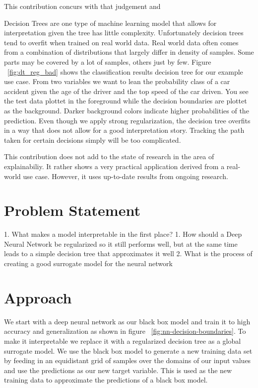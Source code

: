 \documentclass{article} %
\begin{document}
This contribution concurs with that judgement and 

Decision Trees are one type of machine learning model that allows for interpretation given the tree has little complexity. Unfortunately decision trees tend to overfit when trained on real world data. Real world data often comes from a combination of distributions that largely differ in density of samples. Some parts may be covered by a lot of samples, others just by few. Figure ~\ref{fig:dt_reg_bad} shows the classification results decision tree for our example use case. From two variables we want to lean the probability class of a car accident given the age of the driver and the top speed of the car driven. You see the test data plottet in the foreground while the decision boundaries are plottet as the background. Darker background colors indicate higher probabilities of the prediction. Even though we apply strong regularization, the decision tree overfits in a way that does not allow for a good interpretation story. Tracking the path taken for certain decisions simply will be too complicated.

This contribution does not add to the state of research in the area of explainabiliy. It rather shows a very practical application derived from a real-world use case. However, it uses up-to-date results from ongoing research.

\section{Problem Statement}

1. What makes a model interpretable in the first place?
1. How should a Deep Neural Network be regularized so it still performs well, but at the same time leads to a simple decision tree that approximates it well
2. What is the process of creating a good surrogate model for the neural network

\section{Approach}

We start with a deep neural network as our black box model and train it to high accuracy and generalization as shown in figure ~\ref{fig:nn-decision-boundaries}. To make it interpretable we replace it with a regularized decision tree as a global surrogate model. We use the black box model to generate a new training data set by feeding in an equidistant grid of samples over the domains of our input values and use the predictions as our new target variable. This is used as the new training data to approximate the predictions of a black box model.
\end{document}

